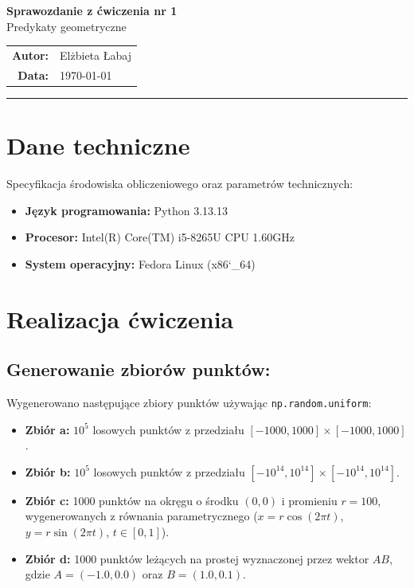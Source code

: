 \documentclass[11pt,a4paper]{article}
\begin{document}
\begin{center}
    {\LARGE \textbf{Sprawozdanie z ćwiczenia nr 1}} \\[0.5em]
    {\Large Predykaty geometryczne} \\[1.5em]
    
    \begin{tabular}{rl}
        \textbf{Autor:} & Elżbieta Łabaj \\
        \textbf{Data:} & \today \\
    \end{tabular}
\end{center}

\vspace{1em}
\hrule
\vspace{1em}

\section{Dane techniczne}
Specyfikacja środowiska obliczeniowego oraz parametrów technicznych:
\begin{itemize}
    \item \textbf{Język programowania:} Python 3.13.13
    \item \textbf{Procesor:} Intel(R) Core(TM) i5-8265U CPU 1.60GHz

    \item \textbf{System operacyjny:} Fedora Linux (x86\char`_64)
\end{itemize}

\section{Realizacja ćwiczenia}
\subsection{Generowanie zbiorów punktów:}
    
    Wygenerowano następujące zbiory punktów używając \texttt{np.random.uniform}:
    \begin{itemize}
        \item \textbf{Zbiór a:} $10^5$ losowych punktów z przedziału $[-1000, 1000] \times [-1000, 1000]$.
        \item \textbf{Zbiór b:} $10^5$ losowych punktów z przedziału $[-10^{14}, 10^{14}] \times [-10^{14}, 10^{14}]$.
        \item \textbf{Zbiór c:} 1000 punktów na okręgu o środku $(0,0)$ i promieniu $r=100$, wygenerowanych z równania parametrycznego ($x = r \cos(2 \pi t)$, $y = r \sin(2 \pi t)$, $t \in [0, 1]$).
        \item \textbf{Zbiór d:} 1000 punktów leżących na prostej wyznaczonej przez wektor $AB$, gdzie $A = (-1.0, 0.0)$ oraz $B = (1.0, 0.1)$.
    \end{itemize}
\end{document}
